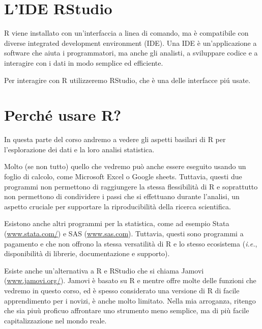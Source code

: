  

\section{L'IDE RStudio}
\label{sec:RStudiointro}

R viene installato con un'interfaccia a linea di comando, ma \`e compatibile con diverse integrated development environment (IDE). Una IDE è un'applicazione  a software che aiuta i programmatori, ma anche gli analisti, a sviluppare codice e a interagire con i dati in modo semplice ed efficiente.

\noindent Per interagire con R utilizzeremo RStudio, che \`e una delle interfacce pi\'u usate.



\section{Perch\'e usare R?}

In questa parte del corso andremo a vedere gli aspetti basilari di R per l'esplorazione dei dati e la loro analisi statistica. 

\noindent Molto (se non tutto) quello che vedremo pu\`o anche essere eseguito usando un foglio di calcolo, come Microsoft Excel o Google sheets. Tuttavia, questi due programmi non permettono di raggiungere la stessa flessibilit\`a di R e soprattutto non permettono di condividere i passi che si effettuano durante l'analisi, un aspetto cruciale per supportare la riproducibilit\`a della ricerca scientifica.

\noindent Esistono anche altri programmi per la statistica, come ad esempio Stata (\url{www.stata.com/}) e SAS (\url{www.sas.com}). Tuttavia, questi sono programmi a pagamento e che non offrono la stessa versatilit\`a di R e lo stesso ecosistema (\emph{i.e.}, disponibilit\`a di librerie, documentazione e supporto). 

\noindent Esiste anche un'alternativa a R e RStudio che si chiama Jamovi (\url{www.jamovi.org/}). Jamovi \`e basato su R e mentre offre molte delle funzioni che vedremo in questo corso, ed \`e spesso considerato una versione di R di facile apprendimento per i novizi, \`e anche molto limitato. Nella mia arroganza, ritengo che sia piu\`u proficuo affrontare uno strumento meno semplice, ma di pi\`u facile capitalizzazione nel mondo reale.



%
%




